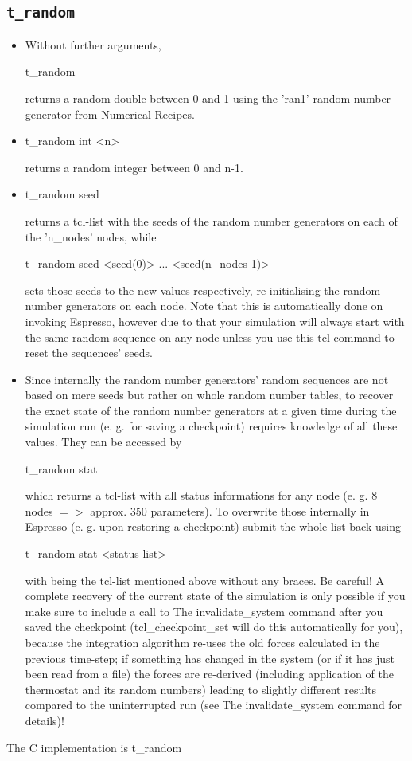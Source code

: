 \subsection{\texttt{t\_random}}
\label{ssec:trandom}
\begin{itemize}
 \item
   Without further arguments,
\begin{code}
t\_random
\end{code}
returns a random double between 0 and 1 using the 'ran1' random number
generator from Numerical Recipes.
 \item
\begin{code}
t\_random int <n>
\end{code}
  returns a random integer between 0 and n-1.
 \item
\begin{code}
t\_random seed
\end{code}
returns a tcl-list with the seeds of the random number generators on
each of the 'n\_nodes' nodes, while
\begin{code}
t\_random seed <seed(0)> ... <seed(n\_nodes-1)>
\end{code}
sets those seeds to the new values respectively, re-initialising the
random number generators on each node.  Note that this is
automatically done on invoking Espresso, however due to that your
simulation will always start with the same random sequence on any node
unless you use this tcl-command to reset the sequences' seeds.
\item Since internally the random number generators' random sequences
  are not based on mere seeds but rather on whole random number
  tables, to recover the exact state of the random number generators
  at a given time during the simulation run (e. g. for saving a
  checkpoint) requires knowledge of all these values. They can be
  accessed by
\begin{code}
t\_random stat
\end{code}
which returns a tcl-list with all status informations for any node (e.
g. 8 nodes $=>$ approx. 350 parameters). To overwrite those internally
in Espresso (e. g. upon restoring a checkpoint) submit the whole list
back using
\begin{code}
t\_random stat <status-list>
\end{code}
with  being the tcl-list mentioned above without any
braces.  Be careful! A complete recovery of the current state of the
simulation is only possible if you make sure to include a call to The
invalidate\_system command after you saved the checkpoint
(tcl\_checkpoint\_set will do this automatically for you), because the
integration algorithm re-uses the old forces calculated in the
previous time-step; if something has changed in the system (or if it
has just been read from a file) the forces are re-derived (including
application of the thermostat and its random numbers) leading to
slightly different results compared to the uninterrupted run (see The
invalidate\_system command for details)!
\end{itemize}
The C implementation is t\_random

